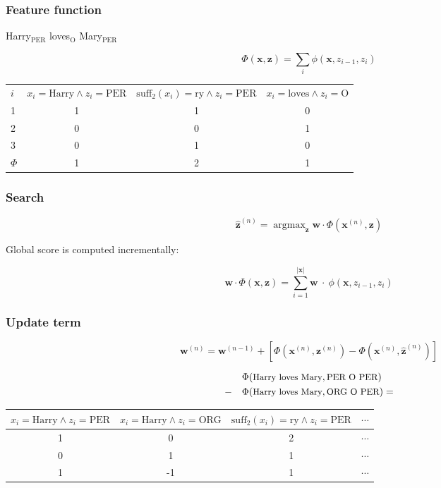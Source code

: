 \documentclass[usenames,dvipsnames]{beamer}
\DeclareMathOperator*{\argmax}{argmax}
\newcommand{\x}{\mathbf{x}}
\newcommand{\z}{\mathbf{z}}
\newcommand{\w}{\mathbf{w}}
\begin{document}
\begin{frame}\frametitle{Feature function}



  \begin{center}
    \alert{Harry}$_{\text{PER}}$ loves$_\text{O}$
    \alert{Mary}$_{\text{PER}}$
  \end{center}


\[
\Phi(\x,\z) = \sum_i \phi(\x,z_{i-1},z_i)
\]


\begin{footnotesize}
  \begin{tabular}{l|ccc}
    $i$ 
               & $x_i=\text{Harry}\wedge z_i=\text{PER}$
               & $\mathrm{suff}_2(x_{i})=\text{ry} \wedge z_i=\text{PER}$
               & $x_i=\text{loves}\wedge z_i=\text{O}$ \\
   1           & 1 & 1 & 0 \\
   2           & 0 & 0 & 1 \\
   3           & 0 & 1 & 0 \\\hline
  $\Phi$       & 1 & 2 & 1 \\
  \end{tabular}  
\end{footnotesize}
\end{frame}


\begin{frame}
  \frametitle{Search}
\begin{block}{}
\[
\hat{\z}^{(n)} = \argmax_\z \w \cdot \Phi(\x^{(n)},\z)
\]
\end{block}
Global score is computed incrementally:

\[
\w \cdot \Phi(\x,\z) = \sum_{i=1}^{|\x|}\w~\cdot~\phi(\x,z_{i-1},z_i)
\]
\end{frame}


\begin{frame}
  \frametitle{Update term}
\begin{block}{}
\[
\w^{(n)} = \w^{(n-1)} + \left[ \Phi(\x^{(n)},\z^{(n)}) - \Phi(\x^{(n)},\hat{\z}^{(n)})
\right]
\]
\end{block}

\[
\begin{aligned}
&    &&  \Phi(\text{\small Harry loves Mary},\text{\small PER O PER}) \\
& -  &&  \Phi(\text{\small Harry loves Mary},\text{\small ORG O PER}) = 
\end{aligned}
\]

\begin{scriptsize}
  \begin{tabular}{cccc}
                 $x_i=\text{Harry}\wedge z_i=\text{PER}$
               & $x_i=\text{Harry}\wedge z_i=\text{ORG}$
               & $\mathrm{suff}_2(x_{i})=\text{ry} \wedge z_i=\text{PER}$
               & $\cdots$ \\\hline
 1 & 0  & 2 & $\cdots$ \\
 0 & 1  & 1 & $\cdots$ \\\hline
 1 & -1 & 1 & $\cdots$ \\
\end{tabular}
  
\end{scriptsize}
\end{frame}
\end{document}

